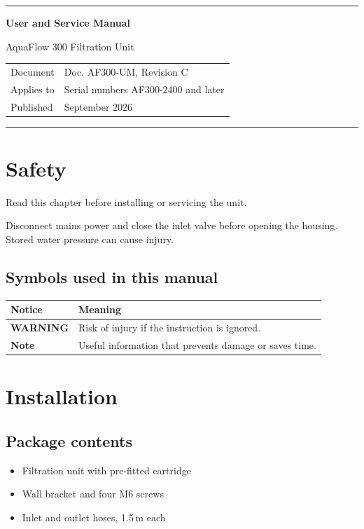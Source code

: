 \documentclass[10pt,a4paper]{report}
\newcommand{\productname}{AquaFlow 300 Filtration Unit}
\newcommand{\docid}{Doc. AF300-UM, Revision C}
\begin{document}
\begin{titlepage}
\color{DarkSlateBlue}
\rule{\linewidth}{6pt}\par
\vspace{3cm}
{\fontsize{34}{40}\selectfont\bfseries User and Service Manual\par}
\vspace{1em}
{\Huge \productname\par}
\vfill
\color{black}
\begin{tabularx}{\linewidth}{@{}lX@{}}
Document & \docid \\
Applies to & Serial numbers AF300-2400 and later \\
Published & September 2026 \\
\end{tabularx}
\vspace{1em}
{\color{DarkSlateBlue}\rule{\linewidth}{1pt}}
\end{titlepage}

\tableofcontents

\chapter{Safety}
Read this chapter before installing or servicing the unit.

\begin{warningbox}
Disconnect mains power and close the inlet valve before opening the housing. Stored water pressure can cause injury.
\end{warningbox}

\section{Symbols used in this manual}
\begin{tabularx}{\linewidth}{@{}lX@{}}
\toprule
Notice & Meaning \\
\midrule
\textbf{WARNING} & Risk of injury if the instruction is ignored. \\
\textbf{Note} & Useful information that prevents damage or saves time. \\
\bottomrule
\end{tabularx}

\chapter{Installation}
\section{Package contents}
\begin{itemize}[nosep]
  \item Filtration unit with pre-fitted cartridge
  \item Wall bracket and four M6 screws
  \item Inlet and outlet hoses, 1.5\,m each
\end{itemize}
\end{document}
